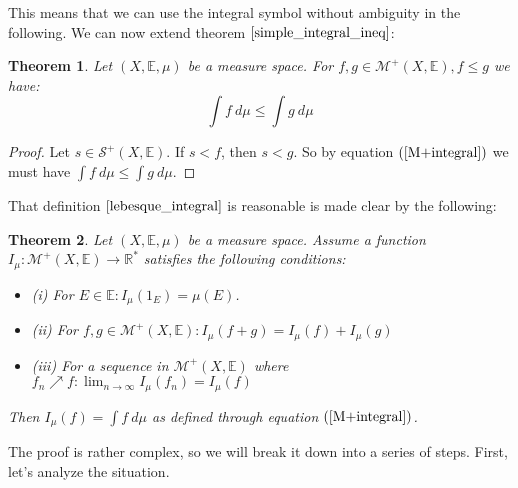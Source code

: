 \documentclass[12pt, a4paper]{article}
\newtheorem{theorem}{Theorem}[section]
\numberwithin{equation}{section}
\begin{document}
This means that we can use the integral symbol without ambiguity in the following. We can now extend theorem $\ref{simple_integral_ineq}$:

\begin{theorem}
\label{integral_ineq}
Let $(X,\mathbb{E},\mu)$ be a measure space. For $f,g\in\mathcal{M}^+(X,\mathbb{E}), f\le g$ we have:
\begin{equation}
\int f\ d\mu\le\int g\ d\mu
\end{equation}
\end{theorem}
\begin{proof}
Let $s\in\mathcal{S}^+(X,\mathbb{E})$. If $s<f$, then $s<g$. So by equation $(\ref{M+integral})$ we must have $\int f\ d\mu\le\int g\ d\mu$.
\end{proof}

That definition $\ref{lebesque_integral}$ is reasonable is made clear by the following:

\begin{theorem}
\label{unique_integral_exists}
Let $(X,\mathbb{E},\mu)$ be a measure space. Assume a function $I_\mu: \mathcal{M}^+(X,\mathbb{E})\rightarrow\mathbb{R}^*$ satisfies the following conditions:
\begin{itemize}
\item (i) For $E\in\mathbb{E}: I_\mu(1_E)=\mu(E)$.
\item (ii) For $f,g\in\mathcal{M}^+(X,\mathbb{E}): I_\mu(f+g)=I_\mu(f)+I_\mu(g)$
\item (iii) For a sequence in $\mathcal{M}^+(X,\mathbb{E})$ where $f_n\nearrow f: \lim_{n\rightarrow\infty}I_\mu(f_n)=I_\mu(f)$
\end{itemize}
Then $I_\mu(f)=\int f\ d\mu$ as defined through equation $(\ref{M+integral})$.
\end{theorem}

The proof is rather complex, so we will break it down into a series of steps. First, let's analyze the situation.
\end{document}
